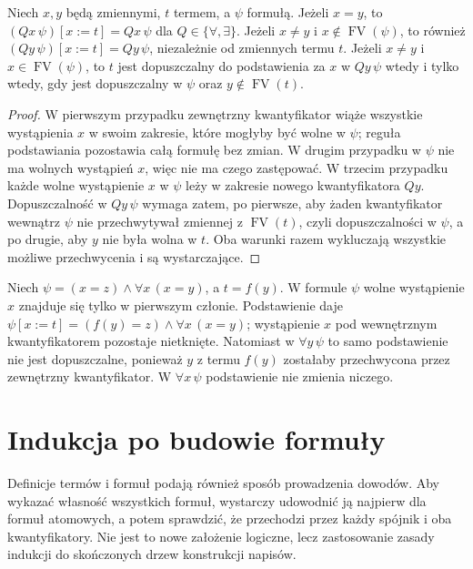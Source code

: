 \begin{lemat}\label{lem:syntax-shadowing-lxvii}
Niech $x,y$ będą zmiennymi, $t$ termem, a $\psi$ formułą.
Jeżeli $x=y$, to $(Qx\,\psi)[x:=t]=Qx\,\psi$ dla
$Q\in\{\forall,\exists\}$. Jeżeli $x\ne y$ i
$x\notin\operatorname{FV}(\psi)$, to również
$(Qy\,\psi)[x:=t]=Qy\,\psi$, niezależnie od zmiennych termu $t$.
Jeżeli $x\ne y$ i $x\in\operatorname{FV}(\psi)$, to
$t$ jest dopuszczalny do podstawienia za $x$ w $Qy\,\psi$
wtedy i tylko wtedy, gdy jest dopuszczalny w $\psi$
oraz $y\notin\operatorname{FV}(t)$.
\end{lemat}
\begin{proof}
W pierwszym przypadku zewnętrzny kwantyfikator wiąże
wszystkie wystąpienia $x$ w swoim zakresie, które mogłyby
być wolne w $\psi$; reguła podstawiania pozostawia całą
formułę bez zmian. W drugim przypadku w $\psi$ nie ma
wolnych wystąpień $x$, więc nie ma czego zastępować.
W trzecim przypadku każde wolne wystąpienie $x$ w $\psi$
leży w zakresie nowego kwantyfikatora $Qy$.
Dopuszczalność w $Qy\,\psi$ wymaga zatem, po pierwsze,
aby żaden kwantyfikator wewnątrz $\psi$ nie przechwytywał
zmiennej z $\operatorname{FV}(t)$, czyli dopuszczalności
w $\psi$, a po drugie, aby $y$ nie była wolna w $t$.
Oba warunki razem wykluczają wszystkie możliwe
przechwycenia i są wystarczające.
\end{proof}
\begin{przyklad}
Niech $\psi=(x=z)\land\forall x\,(x=y)$, a $t=f(y)$.
W formule $\psi$ wolne wystąpienie $x$ znajduje się tylko
w pierwszym członie. Podstawienie daje
$\psi[x:=t]=(f(y)=z)\land\forall x\,(x=y)$;
wystąpienie $x$ pod wewnętrznym kwantyfikatorem pozostaje
nietknięte. Natomiast w $\forall y\,\psi$ to samo
podstawienie nie jest dopuszczalne, ponieważ $y$ z termu
$f(y)$ zostałaby przechwycona przez zewnętrzny kwantyfikator.
W $\forall x\,\psi$ podstawienie nie zmienia niczego.
\end{przyklad}

\section{Indukcja po budowie formuły}
Definicje termów i formuł podają również sposób prowadzenia dowodów.
Aby wykazać własność wszystkich formuł, wystarczy udowodnić ją
najpierw dla formuł atomowych, a potem sprawdzić, że przechodzi
przez każdy spójnik i oba kwantyfikatory. Nie jest to nowe
założenie logiczne, lecz zastosowanie zasady indukcji do skończonych
drzew konstrukcji napisów.

